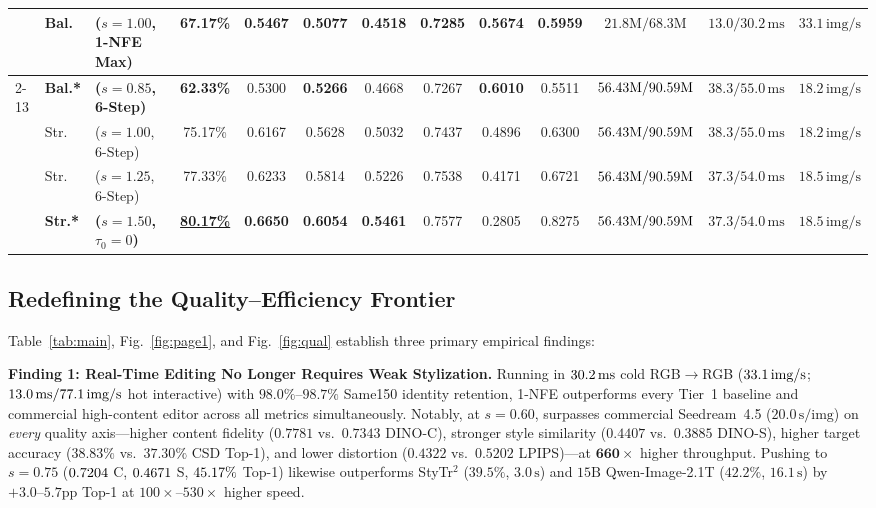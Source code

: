\documentclass[conference]{IEEEtran}
\begin{document}
\begin{table}[t]
{\begin{tabular}{@{}lllcccccccccc@{}}
& Bal. & \methodecore{} ($s=1.00$, 1-NFE Max) & 67.17\% & 0.5467 & 0.5077 & 0.4518 & 0.7285 & 0.5674 & 0.5959 & $21.8\text{M} / 68.3\text{M}$ & $13.0 / 30.2\,\text{ms}$ & $33.1\,\text{img/s}$ \\
\cmidrule{2-13}
& \textbf{Bal.*} & \textbf{\methodpcore{} ($s=0.85$, 6-Step)} & \textbf{62.33\%} & 0.5300 & \textbf{0.5266} & 0.4668 & 0.7267 & \textbf{0.6010} & 0.5511 & $56.43\text{M} / 90.59\text{M}$ & $38.3 / 55.0\,\text{ms}$ & $18.2\,\text{img/s}$ \\
& Str. & \methodpcore{} ($s=1.00$, 6-Step) & 75.17\% & 0.6167 & 0.5628 & 0.5032 & 0.7437 & 0.4896 & 0.6300 & $56.43\text{M} / 90.59\text{M}$ & $38.3 / 55.0\,\text{ms}$ & $18.2\,\text{img/s}$ \\
& Str. & \methodpcore{} ($s=1.25$, 6-Step) & 77.33\% & 0.6233 & 0.5814 & 0.5226 & 0.7538 & 0.4171 & 0.6721 & $56.43\text{M} / 90.59\text{M}$ & $37.3 / 54.0\,\text{ms}$ & $18.5\,\text{img/s}$ \\
& \textbf{Str.*} & \textbf{\methodpcore{} ($s=1.50$, $\tau_0\!=\!0$)} & \underline{\textbf{80.17\%}} & \textbf{0.6650} & \textbf{0.6054} & \textbf{0.5461} & 0.7577 & 0.2805 & 0.8275 & $56.43\text{M} / 90.59\text{M}$ & $37.3 / 54.0\,\text{ms}$ & $18.5\,\text{img/s}$ \\
\bottomrule
\end{tabular}%
}
\vspace{-2.4mm}
\end{table}

\subsection{Redefining the Quality--Efficiency Frontier}

Table~\ref{tab:main}, Fig.~\ref{fig:page1}, and Fig.~\ref{fig:qual} establish three primary empirical findings:

\textbf{Finding 1: Real-Time Editing No Longer Requires Weak Stylization.}
Running in $30.2\,\text{ms}$ cold RGB$\to$RGB ($33.1\,\text{img/s}$; $13.0\,\text{ms} / 77.1\,\text{img/s}$ hot interactive) with $98.0\%\text{--}98.7\%$ Same150 identity retention, 1-NFE \textbf{\methodecore} outperforms every Tier~1 baseline and commercial high-content editor across all metrics simultaneously. Notably, at $s=0.60$, \textbf{\methodecore} surpasses commercial Seedream~4.5 ($20.0\,\text{s/img}$) on \emph{every} quality axis---higher content fidelity ($0.7781$ vs.\ $0.7343$ DINO-C), stronger style similarity ($0.4407$ vs.\ $0.3885$ DINO-S), higher target accuracy ($38.83\%$ vs.\ $37.30\%$ CSD Top-1), and lower distortion ($0.4322$ vs.\ $0.5202$ LPIPS)---at $\mathbf{660\times}$ higher throughput. Pushing to $s=0.75$ ($0.7204$ C, $0.4671$ S, $45.17\%$ Top-1) likewise outperforms StyTr$^2$ ($39.5\%$, $3.0\,\text{s}$) and $15\text{B}$ Qwen-Image-2.1T ($42.2\%$, $16.1\,\text{s}$) by $+3.0\text{--}5.7\text{pp}$ Top-1 at $100\times\text{--}530\times$ higher speed.
\end{document}
